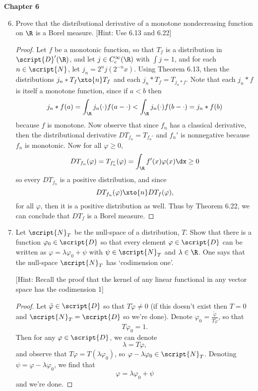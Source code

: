 \documentclass[12pt,letterpaper]{article}
\renewcommand{\phi}{\varphi}
\begin{document}
\pagebreak
\textbf{Chapter 6}

\renewcommand{\N}{\script{N}}
\newcommand{\D}{\script{D}}
\renewcommand{\L}{L}

\begin{enumerate}
\setcounter{enumi}{5}
\item Prove that the distributional derivative of a monotone nondecreasing
function on $\R$ is a Borel measure. [Hint: Use 6.13 and 6.22]

\begin{proof}
Let $f$ be a monotonic function, so that $T_f$ is a distribution in $\D'(\R)$, and %
let $j\in C^\infty_c(\R)$ with $\int j=1$, and for each $n\in\N$, let $j_n=2^nj(2^{-n}x)$. Using Theorem 6.13, then %
the distributions $j_n*T_f\xto{n}T_f$
and each $j_n*T_f=T_{j_n*f}$. Note that each $j_n*f$ is itself a monotone function, since if $a<b$ then 
$$j_n*f(a) = \int_\R j_n(\cdot)f(a-\cdot) < \int_\R j_n(\cdot)f(b-\cdot) = j_n*f(b)$$
because $f$ is monotone. Now observe that since $f_n$ has a classical derivative, then the distributional derivative $DT_{f_n}={T_{f_n'}}$ and $f_n'$ is nonnegative because $f_n$ is monotonic. Now for all $\phi\geq0$, 
$${DT_{f_n}(\phi)}={T_{f_n'}(\phi)}=\int_\R f'(x)\phi(x)\dx\geq 0$$
so every $DT_{f_n}$ is a positive distribution, and since 
$$DT_{f_n}(\phi)\xto{n} DT_{f}(\phi),$$
for all $\phi$, then it is a positive distribution as well. Thus by Theorem 6.22, we can conclude that $DT_{f}$ is a Borel measure. 
\end{proof}

\item Let $\N_T$ be the null-space of a distribution, $T$. Show that there is a function $\phi_0\in \D$ so that every element $\phi\in\D$ can be written as $\phi = \lambda\phi_0+\psi$ with $\psi\in\N_T$ and $\lambda\in\R$. One says that the null-space $\N_T$ has `codimension one'.

[Hint: Recall the proof that the kernel of any linear
functional in any vector space has the codimension 1]

\begin{proof}
Let $\tilde{\phi}\in \D$ so that $T\tilde{\phi}\neq0$ (if this doesn't exist then $T=0$ and $\N_T=\D$ so we're done). Denote $\phi_0=\frac{\tilde{\phi}}{{T{\tilde{\phi}}}}$, so that $$T\phi_0=1.$$ Then for any $\phi\in \D$, we can denote $$\lambda=T\phi,$$ and observe that $T\phi=T(\lambda\phi_0)$, so $\phi-\lambda\phi_0\in\N_T$. Denoting $\psi=\phi-\lambda\phi_0$, we find that
$$\phi = \lambda\phi_0+\psi$$
and we're done. 
\end{proof}


\end{enumerate}
\end{document}
